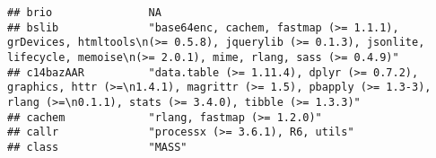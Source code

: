 \documentclass[
]{article}
\begin{document}
\begin{verbatim}
## brio               NA                                                                                                                                                                                                                                                                                                                                                                                                                                           
## bslib              "base64enc, cachem, fastmap (>= 1.1.1), grDevices, htmltools\n(>= 0.5.8), jquerylib (>= 0.1.3), jsonlite, lifecycle, memoise\n(>= 2.0.1), mime, rlang, sass (>= 0.4.9)"                                                                                                                                                                                                                                                                      
## c14bazAAR          "data.table (>= 1.11.4), dplyr (>= 0.7.2), graphics, httr (>=\n1.4.1), magrittr (>= 1.5), pbapply (>= 1.3-3), rlang (>=\n0.1.1), stats (>= 3.4.0), tibble (>= 1.3.3)"                                                                                                                                                                                                                                                                        
## cachem             "rlang, fastmap (>= 1.2.0)"                                                                                                                                                                                                                                                                                                                                                                                                                  
## callr              "processx (>= 3.6.1), R6, utils"                                                                                                                                                                                                                                                                                                                                                                                                             
## class              "MASS"                                                                                                                                                                                                                                                                                                                                                                                                                                       

\end{verbatim}
\end{document}
